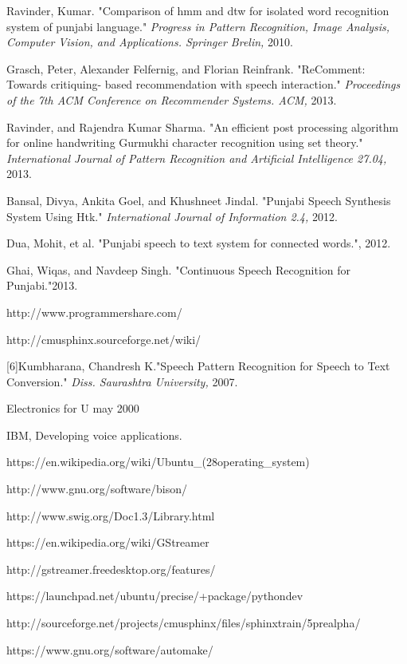 \documentclass[12pt,a4paper,oldfontcommands]{memoir}
\begin{document}
\begin{thebibliography}{9}
 Ravinder, Kumar. "Comparison of hmm and dtw for isolated word recognition system of punjabi language."
\textit{Progress in Pattern Recognition, Image Analysis, Computer Vision, and Applications. Springer Brelin,} 2010.

Grasch, Peter, Alexander Felfernig, and Florian Reinfrank. "ReComment: Towards critiquing-
based recommendation with speech interaction."
\textit{Proceedings of the 7th ACM Conference on Recommender Systems. ACM,} 2013.

Ravinder, and Rajendra Kumar Sharma. "An efficient post processing algorithm for online handwriting Gurmukhi character recognition using set theory."
\textit{International Journal of Pattern Recognition and Artificial Intelligence 27.04,} 2013.

Bansal, Divya, Ankita Goel, and Khushneet Jindal. "Punjabi Speech Synthesis System Using Htk."
\textit{International Journal of Information 2.4,} 2012.

Dua, Mohit, et al. "Punjabi speech to text system for connected words.", 2012.
\textit{}

Ghai, Wiqas, and Navdeep Singh. "Continuous Speech Recognition for Punjabi."2013.
\textit{}

http://www.programmershare.com/

http://cmusphinx.sourceforge.net/wiki/

[6]Kumbharana, Chandresh K."Speech Pattern Recognition for Speech to Text Conversion."
\textit{Diss. Saurashtra University,} 2007.

 Electronics for U may 2000

IBM, Developing voice applications.

 https://en.wikipedia.org/wiki/Ubuntu\_(28operating\_system)
\textit{}

http://www.gnu.org/software/bison/
\textit{}

http://www.swig.org/Doc1.3/Library.html
\textit{}

https://en.wikipedia.org/wiki/GStreamer
\textit{}

http://gstreamer.freedesktop.org/features/
\textit{}

https://launchpad.net/ubuntu/precise/+package/pythondev
\textit{}

http://sourceforge.net/projects/cmusphinx/files/sphinxtrain/5prealpha/
\textit{}

https://www.gnu.org/software/automake/
\textit{}



\end{thebibliography}
\end{document}
